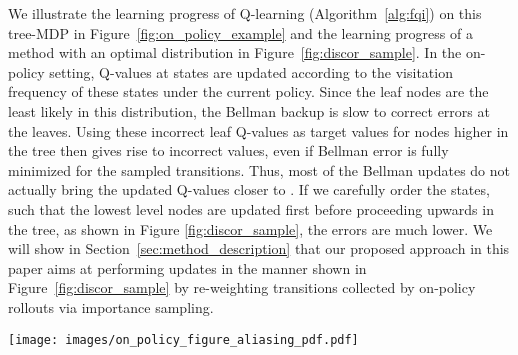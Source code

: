 \documentclass[jmlr]{article}
\begin{document}
{We illustrate the learning progress of Q-learning (Algorithm~\ref{alg:fqi}) on this tree-MDP in Figure~\ref{fig:on_policy_example} and the learning progress of a method with an optimal distribution in Figure~\ref{fig:discor_sample}. In the on-policy setting, Q-values at states are updated according to the visitation frequency of these states under the current policy.
Since the leaf nodes are the least likely in this distribution, the Bellman backup is slow to correct errors at the leaves. Using these incorrect leaf Q-values as target values for nodes higher in the tree then gives rise to incorrect
values, even if Bellman error is fully minimized for the sampled transitions. Thus, most of the Bellman updates do not actually bring the updated Q-values closer to .
If we carefully order the states, such that the lowest level nodes are updated first before proceeding upwards in the tree, as shown in Figure \ref{fig:discor_sample}, the errors are much lower. We will show in Section~\ref{sec:method_description} that our proposed approach in this paper aims at performing updates in the manner shown in Figure~\ref{fig:discor_sample} by re-weighting transitions collected by on-policy rollouts via importance sampling.}

\begin{figure*}
\centering
\texttt{[image: images/on\_policy\_figure\_aliasing\_pdf.pdf]}
    \caption{\footnotesize{Iterations of Q-learning on a tree-structured MDP. Trajectories are sampled using the current policy, with each trial (shown as dotted borders around states) starting from the root. Function approximation leads to aliasing of box-shaped nodes and circle-shaped nodes, such that updates to one circle-shaped node affect all other circles, and likewise for box-shaped nodes. Due to the training distribution and aliasing, this method often backs up incorrect target values. Due to aliasing, previously correct values at other states may become incorrect due to these erroneous backups, resulting in non-convergence. This issue is due to each of the leaf nodes (which cause the errors) being sampled less often than the nodes higher in the tree (which suffer from these errors), thus disabling  the algorithm from correct erroneous target values.}}
  \vspace{-15pt}
  \label{fig:on_policy_example}
\end{figure*}
\end{document}
